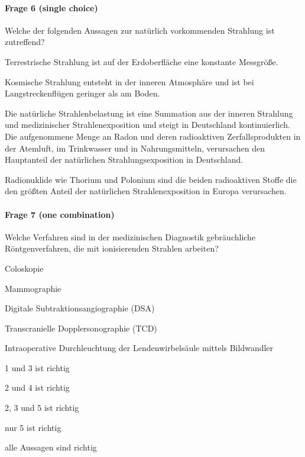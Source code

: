\paragraph{Frage 6 (single choice)}

Welche der folgenden Aussagen zur natürlich vorkommenden Strahlung ist zutreffend?
\begin{benumerate}
  \item Terrestrische Strahlung ist auf der Erdoberfläche eine konstante Messgröße.
  \item Kosmische Strahlung entsteht in der inneren Atmosphäre und ist bei Langstreckenflügen geringer als am Boden.
  \item Die natürliche Strahlenbelastung ist eine Summation aus der inneren Strahlung und medizinischer Strahlenexposition und steigt in Deutschland kontinuierlich.
  \bolditem Die aufgenommene Menge an Radon und deren radioaktiven Zerfallsprodukten in der Atemluft, im Trinkwasser und in Nahrungsmitteln, verursachen den Hauptanteil der natürlichen Strahlungsexposition in Deutschland.
  \item Radionuklide wie Thorium und Polonium sind die beiden radioaktiven Stoffe die den größten Anteil der natürlichen Strahlenexposition in Europa verursachen.
\end{benumerate}

\paragraph{Frage 7 (one combination)}

Welche Verfahren sind in der medizinischen Diagnostik gebräuchliche Röntgenverfahren, die mit ionisierenden Strahlen arbeiten?

\begin{minipage}{.55\linewidth}
  \begin{benumerate}
    \item Coloskopie
    \item Mammographie
    \item Digitale Subtraktionsangiographie (DSA)
    \item Transcranielle Dopplersonographie (TCD)
    \item Intraoperative Durchleuchtung der Lendenwirbelsäule mittels Bildwandler
  \end{benumerate}
\end{minipage}
\hfill
\begin{minipage}{.4\linewidth}
  \begin{checklist}
    \item 1 und 3 ist richtig
    \item 2 und 4 ist richtig
    \item[\checkedbox] 2, 3 und 5 ist richtig
    \item nur 5 ist richtig
    \item alle Aussagen sind richtig
  \end{checklist}
\end{minipage}